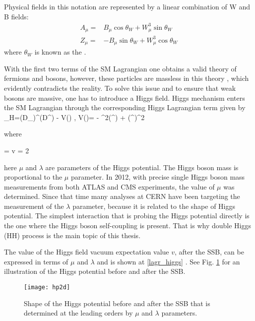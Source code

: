 Physical fields in this notation are represented by a linear combination of W and B fields:
\begin{align}\label{neutral_fields}
A_\mu = &  B_\mu \cos\theta_W + W^3_\mu \sin\theta_W \\ 
Z_\mu = & -B_\mu \sin\theta_W + W^3_\mu \cos\theta_W \nonumber 
\end{align}
\noindent where $\theta_W$ is known as the  \cite{Weinberg:799984}.

With the first two terms of the SM Lagrangian one obtains a valid theory of fermions and bosons, however, these particles are massless in this theory \cite{Wolf:2015kua}, which evidently contradicts the reality. To solve this issue and to ensure that weak bosons are massive, one has to introduce a Higgs field. Higgs mechanism enters the SM Lagrangian through the corresponding Higgs Lagrangian term given by 
\beqn\label{lagr_higgs}
\Lagr_H=(D_\mu\Phi)^\dagger(D^\mu\Phi) - V(\Phi) , \qquad V(\Phi)= - \mu^2(\Phi^\dagger\Phi) + (\Phi^\dagger\Phi)^2
\eeqn

\noindent where

\beqn
\Phi =  \quad {} \quad v = 2 
\eeqn

\noindent here $\mu$ and $\lambda$ are parameters of the Higgs potential. The Higgs boson mass is proportional to the $\mu$ parameter. In 2012, with precise single Higgs boson mass measurements from both ATLAS and CMS experiments, the value of $\mu$ was determined. Since that time many analyses at CERN have been targeting the measurement of the $\lambda$ parameter, because it is related to the shape of Higgs potential. The simplest interaction that is probing the Higgs potential directly is the one where the Higgs boson self-coupling is present. That is why double Higgs (HH) process is the main topic of this thesis.


The value of the Higgs field vacuum expectation value $v$, after the SSB, can be expressed in terms of $\mu$ and $\lambda$ and is shown at \ref{lagr_higgs} \cite{MonroyMontanez:2639240}. See Fig. \ref{hp2d} for an illustration of the Higgs potential before and after the SSB.

\begin{figure}[H]
\centering
\texttt{[image: hp2d]}
\caption[SSB Potential form]{Shape of the Higgs potential before and after the SSB that is determined at the leading orders by $\mu$ and $\lambda$ parameters. }
\label{hp2d}
\end{figure}

